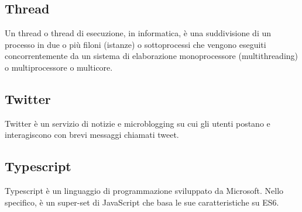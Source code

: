 \subsection*{Thread}
Un thread o thread di esecuzione, in informatica, è una suddivisione di un processo in due o più filoni (istanze) o sottoprocessi che vengono eseguiti concorrentemente da un sistema di elaborazione monoprocessore (multithreading) o multiprocessore o multicore. 

\subsection*{Twitter}
Twitter è un servizio di notizie e microblogging su cui gli utenti postano e interagiscono con brevi messaggi chiamati tweet.

\subsection*{Typescript}
Typescript è un linguaggio di programmazione sviluppato da Microsoft. Nello specifico, è un super-set di JavaScript che basa le sue caratteristiche su ES6.


